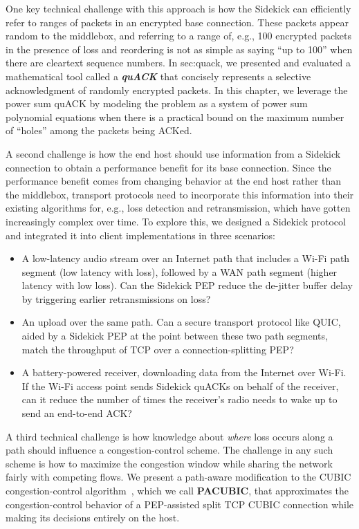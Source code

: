 One key technical challenge with this approach is how the Sidekick can
efficiently refer to ranges of packets in an encrypted base connection. These
packets appear random to the middlebox, and referring to a range of, e.g., 100
encrypted packets in the presence of loss and reordering is not as simple as
saying ``up to 100'' when there are cleartext sequence numbers. In \Cref
{sec:quack}, we presented and evaluated a mathematical tool called a \emph
{\bf quACK} that concisely represents a selective acknowledgment of randomly
encrypted packets. In this chapter, we leverage the power sum quACK by
modeling the problem as a system of power sum
polynomial equations when there is a practical bound on the maximum number of
``holes'' among the packets being ACKed.

A second challenge is how the end host should use information from a Sidekick
connection to obtain a performance benefit for its base connection. Since the
performance benefit comes from changing behavior at the end host rather than
the middlebox, transport protocols need to incorporate this information into
their existing algorithms for, e.g., loss detection and retransmission, which
have gotten increasingly complex over time. To explore this, we designed a
Sidekick protocol and integrated it into client implementations in three scenarios:
\begin{itemize}[noitemsep,topsep=2pt]
\item A low-latency audio stream over an Internet path that includes a Wi-Fi
  path segment (low latency with loss), followed by a WAN path segment (higher
  latency with low loss). Can the Sidekick PEP reduce the de-jitter buffer delay
  by triggering earlier retransmissions on loss?

\item An upload over the same path. Can a secure transport protocol like QUIC,
  aided by a Sidekick PEP at the point between these two path segments, match
  the throughput of TCP over a connection-splitting PEP?

\item A battery-powered receiver, downloading data from the Internet over Wi-Fi.
  If the Wi-Fi access point sends Sidekick quACKs on behalf of the receiver,
  can it reduce the number of times the receiver's radio needs to wake up
  to send an end-to-end ACK?
\end{itemize}

\smallskip

A third technical challenge is how knowledge about \emph{where}
loss occurs along a path should influence a congestion-control scheme.
The challenge in any such scheme is how to maximize the congestion window
while sharing the network fairly with competing flows.
We present a path-aware modification to the CUBIC congestion-control
algorithm~\cite{ha2008cubic}, which we call \mbox{\textbf{PACUBIC}},
that approximates the congestion-control behavior of a PEP-assisted split TCP
CUBIC connection while making its decisions entirely on the host.

